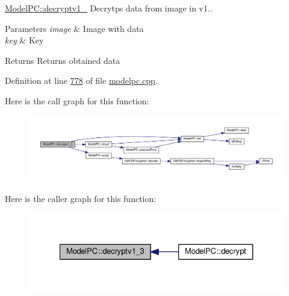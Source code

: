 \hyperlink{class_model_p_c_a4fe70ebbedfaf31d45a35f82d0f06caa}{Model\+P\+C\+::decryptv1\+\_} Decrytps data from image in v1.. 


\begin{DoxyParams}{Parameters}
{\em image} & Image with data \\
\hline
{\em key} & Key \\
\hline
\end{DoxyParams}
\begin{DoxyReturn}{Returns}
Returns obtained data 
\end{DoxyReturn}


Definition at line \hyperlink{modelpc_8cpp_source_l00778}{778} of file \hyperlink{modelpc_8cpp_source}{modelpc.\+cpp}.



Here is the call graph for this function\+:
\nopagebreak
\begin{figure}[H]
\begin{center}
\leavevmode
\includegraphics[width=350pt]{class_model_p_c_a4fe70ebbedfaf31d45a35f82d0f06caa_cgraph}
\end{center}
\end{figure}




Here is the caller graph for this function\+:
\nopagebreak
\begin{figure}[H]
\begin{center}
\leavevmode
\includegraphics[width=327pt]{class_model_p_c_a4fe70ebbedfaf31d45a35f82d0f06caa_icgraph}
\end{center}
\end{figure}


